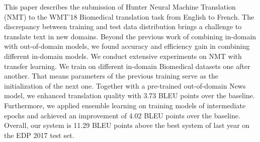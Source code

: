 This paper describes the submission of Hunter Neural Machine Translation (NMT) to the WMT'18 Biomedical translation task from English to French. The discrepancy between training and test data distribution brings a challenge to translate text in new domains. Beyond the previous work of combining in-domain with out-of-domain models, we found accuracy and efficiency gain in combining different in-domain models. We conduct extensive experiments on NMT with transfer learning. We train on different in-domain Biomedical datasets one after another. That means parameters of the previous training serve as the initialization of the next one. Together with a pre-trained out-of-domain News model, we enhanced translation quality with 3.73 BLEU points over the baseline. Furthermore, we applied ensemble learning on training models of intermediate epochs and achieved an improvement of 4.02 BLEU points over the baseline. Overall, our system is 11.29 BLEU points above the best system of last year on the EDP 2017 test set.
